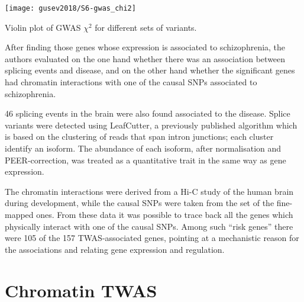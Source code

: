 \documentclass[../main.tex]{subfiles}
\begin{document}
\begin{marginfigure}
	\texttt{[image: gusev2018/S6-gwas\_chi2]}
	\caption{Violin plot of GWAS $\chi^2$ for different sets of 
variants.}
\end{marginfigure}

After finding those genes whose expression is associated to 
schizophrenia, the authors evaluated on the one hand whether there was 
an association between splicing events and disease, and on the other 
hand whether the significant genes had chromatin interactions with one 
of the causal SNPs associated to schizophrenia.

46 splicing events in the brain were also found associated to the 
   disease. Splice variants were detected using LeafCutter, a previously 
published algorithm which is based on the clustering of reads that span 
intron junctions; each cluster identify an isoform. The abundance of 
each isoform, after normalisation and PEER-correction, was treated as a 
quantitative trait in the same way as gene expression.

The chromatin interactions were derived from a Hi-C study of the human 
brain during development, while the causal SNPs were taken from the set 
of the fine-mapped ones. From these data it was possible to trace back all the genes 
which physically interact with one of the causal SNPs. Among such 
\enquote{risk genes} there were 105 of the 157 TWAS-associated genes, 
pointing at a mechanistic reason for the associations and relating gene 
expression and regulation.

\section{Chromatin TWAS}
\end{document}

